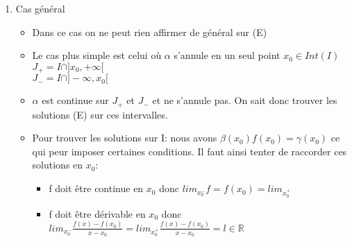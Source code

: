 \documentclass[fleqn]{article}
\theoremstyle{definition} \newtheorem*{defi}{D\'efinition}
\theoremstyle{definition} \newtheorem*{theo}{Th\'eor\`eme}
\theoremstyle{remark} \newtheorem*{rqs}{Remarques}
\begin{document}
\begin{enumerate}
\begin{theo}
			Alors il existe une et une seule solution f de (E) sut I telle que $f(t_0) = y_0$
		\end{theo}
	\item Cas g\'en\'eral
		\begin{itemize}
			\item Dans ce cas on ne peut rien affirmer de g\'en\'eral sur (E)
			\item Le cas plus simple est celui o\`u $\alpha$ s'annule en un seul point $x_0 \in Int(I)$\\
				$J_+ = I \cap ]x_0, +\infty[$\\
				$J_- = I \cap ]-\infty, x_0[$
			\item $\alpha$ est continue sur $J_+$ et $J_-$ et ne s'annule pas. On sait donc trouver les solutions (E) sur ces intervalles.
			\item Pour trouver les solutions sur I: nous avons $\beta(x_0)f(x_0) = \gamma(x_0)$ ce qui peur imposer certaines conditions. Il faut
				ainsi tenter de raccorder ces solutions en $x_0$:
				\begin{itemize}
					\item f doit \^etre continue en $x_0$ donc $lim_{x_0^-} f = f(x_0) = lim_{x_0^+}$
					\item f doit \^etre d\'erivable en $x_0$ donc $lim_{x_0^-} \frac{f(x) - f(x_0)}{x - x_0} = lim_{x_0^+} \frac{f(x) -
						f(x_0)}{x - x_0} = l \in \mathbb{R}$
				\end{itemize}
		\end{itemize}

\end{enumerate}
\end{document}
